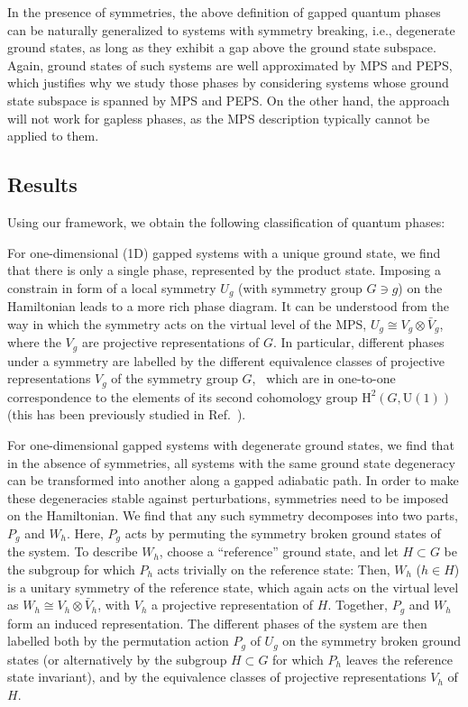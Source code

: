 \documentclass[twocolumn,superscriptaddress,prb,linenumbers]{revtex4-1}
\begin{document}
In the presence of symmetries, the above definition of gapped quantum
phases can be naturally generalized to systems with symmetry breaking,
i.e., degenerate ground states, as long as they exhibit a gap above the
ground state subspace. Again, ground states of such systems are well
approximated by MPS and PEPS, which justifies why we study those phases by
considering systems whose ground state subspace is spanned by MPS and
PEPS.  On the other hand, the approach will not work for gapless phases,
as the MPS description typically cannot be applied to them.

\subsection{Results}


Using our framework, we obtain the following classification of quantum phases:


For one-dimensional (1D) gapped systems with a unique ground state, we
find that there is only a single phase, represented by the product state.
Imposing a constrain in form of a local symmetry $U_g$ (with symmetry
group $G\ni g$) on the Hamiltonian leads to a more rich phase diagram. It
can be understood from the way in which the symmetry acts on the virtual
level of the MPS, $U_g\cong V_g\otimes \bar V_g$, where the $V_g$ are
projective representations of $G$. In particular, different phases under a
symmetry are labelled by the different equivalence classes of projective
representations $V_g$ of the symmetry group
$G$,~\cite{pollmann:1d-sym-protection-prb} which are in one-to-one
correspondence to the elements of its second cohomology group
$\mathrm{H}^2(G,\mathrm{U}(1))$ (this has been previously studied in
Ref.~).

For one-dimensional gapped systems with degenerate ground states, we find
that in the absence of symmetries, all systems with the same ground state
degeneracy  can be transformed into another along a gapped
adiabatic path.  In order to make these degeneracies stable against
perturbations, symmetries need to be imposed on the Hamiltonian. We find
that any such symmetry decomposes into two parts, $P_g$ and $W_h$.  Here,
$P_g$ acts by permuting the symmetry broken ground states of the system.
To describe $W_h$, choose a ``reference'' ground state, and let
$H\subset G$ be the subgroup for which $P_h$ acts trivially on the
reference state: Then, $W_h$ ($h\in H$) is a unitary symmetry of the
reference state, which again acts on the virtual level as $W_h\cong
    V_h\otimes \bar V_h$, with $V_h$ a projective representation of $H$.
Together, $P_g$ and $W_h$ form an induced representation.  The different
phases of the system are then labelled both by the permutation action $P_g$ of
$U_g$ on the symmetry broken ground states (or alternatively by the subgroup
$H\subset G$ for which $P_h$ leaves the reference state invariant),
and by the equivalence classes of projective representations $V_h$
of $H$.
\end{document}
